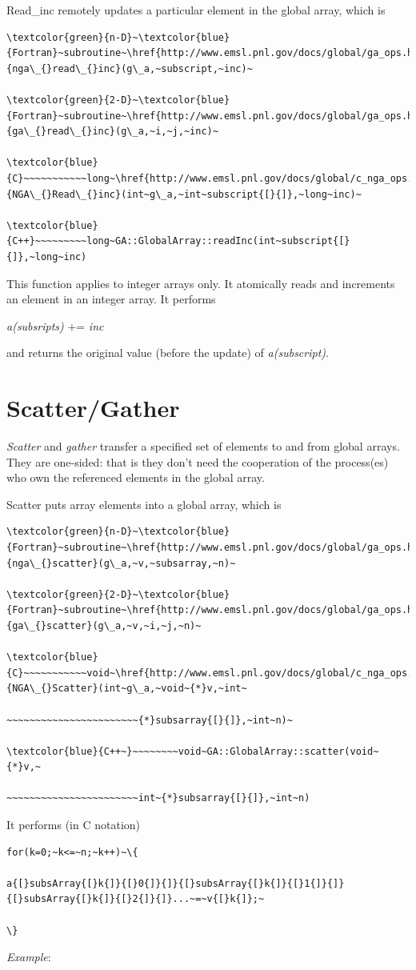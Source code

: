 Read\_inc remotely updates a particular element in the global array,
which is
\begin{verbatim}
\textcolor{green}{n-D}~\textcolor{blue}{Fortran}~subroutine~\href{http://www.emsl.pnl.gov/docs/global/ga_ops.html\#ga_read_inc}{nga\_{}read\_{}inc}(g\_a,~subscript,~inc)~

\textcolor{green}{2-D}~\textcolor{blue}{Fortran}~subroutine~\href{http://www.emsl.pnl.gov/docs/global/ga_ops.html\#ga_read_inc}{ga\_{}read\_{}inc}(g\_a,~i,~j,~inc)~

\textcolor{blue}{C}~~~~~~~~~~~long~\href{http://www.emsl.pnl.gov/docs/global/c_nga_ops.html\#ga_read_inc}{NGA\_{}Read\_{}inc}(int~g\_a,~int~subscript{[}{]},~long~inc)~

\textcolor{blue}{C++}~~~~~~~~~long~GA::GlobalArray::readInc(int~subscript{[}{]},~long~inc)
\end{verbatim}
This function applies to integer arrays only. It atomically reads
and increments an element in an integer array. It performs

\emph{a(subsripts)} += \emph{inc}

and returns the original value (before the update) of \emph{a(subscript)}. 


\section{Scatter/Gather }

\emph{Scatter} and \emph{gather} transfer a specified set of elements
to and from global arrays. They are one-sided: that is they don't
need the cooperation of the process(es) who own the referenced elements
in the global array.

Scatter puts array elements into a global array, which is
\begin{verbatim}
\textcolor{green}{n-D}~\textcolor{blue}{Fortran}~subroutine~\href{http://www.emsl.pnl.gov/docs/global/ga_ops.html\#ga_scatter}{nga\_{}scatter}(g\_a,~v,~subsarray,~n)~

\textcolor{green}{2-D}~\textcolor{blue}{Fortran}~subroutine~\href{http://www.emsl.pnl.gov/docs/global/ga_ops.html\#ga_scatter}{ga\_{}scatter}(g\_a,~v,~i,~j,~n)~

\textcolor{blue}{C}~~~~~~~~~~~void~\href{http://www.emsl.pnl.gov/docs/global/c_nga_ops.html\#ga_scatter}{NGA\_{}Scatter}(int~g\_a,~void~{*}v,~int~

~~~~~~~~~~~~~~~~~~~~~~~{*}subsarray{[}{]},~int~n)~

\textcolor{blue}{C++~}~~~~~~~~void~GA::GlobalArray::scatter(void~{*}v,~

~~~~~~~~~~~~~~~~~~~~~~~int~{*}subsarray{[}{]},~int~n)
\end{verbatim}
It performs (in C notation)
\begin{verbatim}
for(k=0;~k<=~n;~k++)~\{

a{[}subsArray{[}k{]}{[}0{]}{]}{[}subsArray{[}k{]}{[}1{]}{]}{[}subsArray{[}k{]}{[}2{]}{]}...~=~v{[}k{]};~

\}
\end{verbatim}
\emph{Example}:

